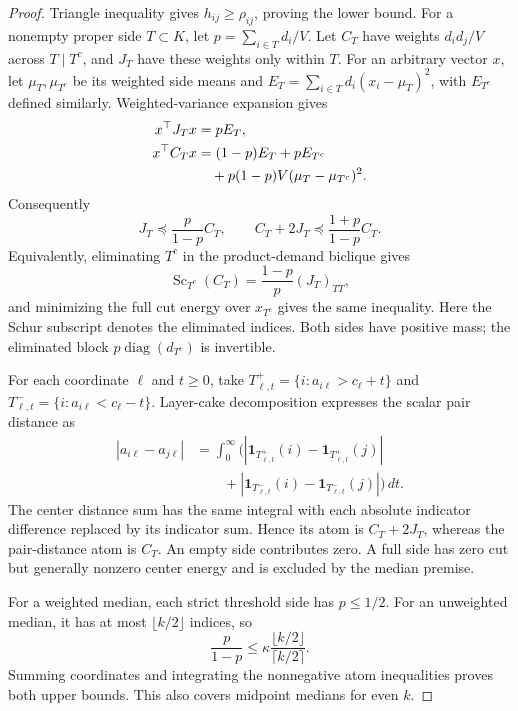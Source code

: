 \documentclass[sigconf,anonymous,review]{acmart}
\newcommand{\1}{\mathbf{1}}
\newcommand{\diag}{\operatorname{diag}}
\begin{document}
\begin{proof}
Triangle inequality gives $h_{ij}\ge\rho_{ij}$, proving the lower bound.
For a nonempty proper side $T\subset K$, let
$p=\sum_{i\in T}d_i/V$. Let $C_T$ have weights $d_id_j/V$ across
$T\mid T^c$, and $J_T$ have these weights only within $T$.
For an arbitrary vector $x$, let $\mu_T,\mu_{T^c}$ be its weighted side means
and $E_T=\sum_{i\in T}d_i(x_i-\mu_T)^2$, with $E_{T^c}$ defined similarly.
Weighted-variance expansion gives
\begin{align}
 x^\top J_Tx&=pE_T,\notag\\
 x^\top C_Tx&=(1-p)E_T+pE_{T^c}\notag\\
 &\quad+p(1-p)V(\mu_T-\mu_{T^c})^2.
 \label{eq:profile-cut-variance}
\end{align}
Consequently
\[
 J_T\preceq\frac{p}{1-p}C_T,\qquad
 C_T+2J_T\preceq\frac{1+p}{1-p}C_T.
\]
Equivalently, eliminating $T^c$ in the product-demand biclique gives
\[
 \operatorname{Sc}_{T^c}(C_T)
 =\frac{1-p}{p}(J_T)_{TT},
\]
and minimizing the full cut energy over $x_{T^c}$ gives the same inequality.
Here the Schur subscript denotes the eliminated indices. Both sides have
positive mass; the eliminated block $p\diag(d_{T^c})$ is invertible.

For each coordinate $\ell$ and $t\ge0$, take
$T^+_{\ell,t}=\{i:a_{i\ell}>c_\ell+t\}$ and
$T^-_{\ell,t}=\{i:a_{i\ell}<c_\ell-t\}$.
Layer-cake decomposition expresses the scalar pair distance as
\begin{align*}
 |a_{i\ell}-a_{j\ell}|
 &=\int_0^\infty\!\bigl(
 |\1_{T^+_{\ell,t}}(i)-\1_{T^+_{\ell,t}}(j)|\\
 &\qquad+|\1_{T^-_{\ell,t}}(i)-\1_{T^-_{\ell,t}}(j)|\bigr)\,dt.
\end{align*}
The center distance sum has the same integral with each absolute indicator
difference replaced by its indicator sum. Hence its atom is $C_T+2J_T$,
whereas the pair-distance atom is $C_T$.
An empty side contributes zero. A full side has zero cut but generally
nonzero center energy and is excluded by the median premise.

For a weighted median, each strict threshold side has $p\le1/2$.
For an unweighted median, it has at most $\lfloor k/2\rfloor$ indices, so
\[
 \frac{p}{1-p}\le\kappa
       \frac{\lfloor k/2\rfloor}{\lceil k/2\rceil}.
\]
Summing coordinates and integrating the nonnegative atom inequalities proves
both upper bounds. This also covers midpoint medians for even $k$.
\end{proof}
\end{document}
